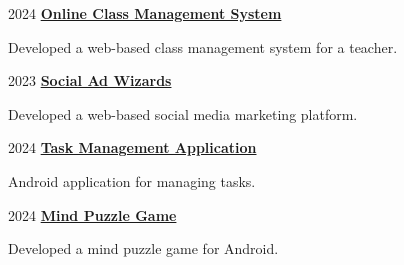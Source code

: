 
\begin{twocolentry}{
      2024
   }
   \textbf{\href{https://github.com/ShanelkaPramuditha/online-class-management-system}{\textcolor{secondaryColor}{Online Class Management System}}}
   \begin{highlights}
      \item Developed a web-based class management system for a teacher.
   \end{highlights}
\end{twocolentry}

\vspace{0.3 cm}

\begin{twocolentry}{
      2023
   }
   \textbf{\href{https://github.com/ShanelkaPramuditha/IWT-Project-Social-Ad-Wizards}{\textcolor{secondaryColor}{Social Ad Wizards}}}
   \begin{highlights}
      \item Developed a web-based social media marketing platform.
   \end{highlights}
\end{twocolentry}

\vspace{0.3 cm}

\begin{twocolentry}{
      2024
   }
   \textbf{\href{https://github.com/ShanelkaPramuditha/task-management-app}{\textcolor{secondaryColor}{Task Management Application}}}
   \begin{highlights}
      \item Android application for managing tasks.
   \end{highlights}
\end{twocolentry}

\vspace{0.3 cm}

\begin{twocolentry}{
      2024
   }
   \textbf{\href{https://github.com/ShanelkaPramuditha/mind-puzzle-kotlin}{\textcolor{secondaryColor}{Mind Puzzle Game}}}
   \begin{highlights}
      \item Developed a mind puzzle game for Android.
   \end{highlights}
\end{twocolentry}

